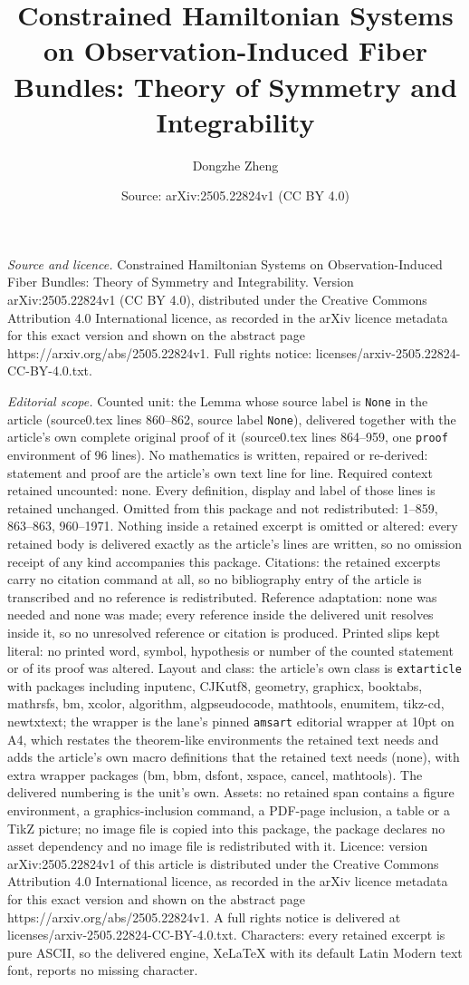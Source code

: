 \documentclass[10pt,a4paper]{amsart}
\title[Constrained Hamiltonian Systems on Observation-Induced Fiber]{Constrained Hamiltonian Systems on Observation-Induced Fiber Bundles: Theory of Symmetry and Integrability}
\author{Dongzhe Zheng}
\date{Source: arXiv:2505.22824v1 (CC BY 4.0)}
\begin{document}
\maketitle

\noindent\emph{Source and licence.} Constrained Hamiltonian Systems on Observation-Induced Fiber Bundles: Theory of Symmetry and Integrability. Version arXiv:2505.22824v1 (CC BY 4.0), distributed under the Creative Commons Attribution 4.0 International licence, as recorded in the arXiv licence metadata for this exact version and shown on the abstract page https://arxiv.org/abs/2505.22824v1. Full rights notice: licenses/arxiv-2505.22824-CC-BY-4.0.txt.\par\smallskip

\noindent\textit{Editorial scope.} Counted unit: the Lemma whose source label is \texttt{None} in the article (source0.tex lines 860--862, source label \texttt{None}), delivered together with the article's own complete original proof of it (source0.tex lines 864--959, one \texttt{proof} environment of 96 lines). No mathematics is written, repaired or re-derived: statement and proof are the article's own text line for line. Required context retained uncounted: none. Every definition, display and label of those lines is retained unchanged. Omitted from this package and not redistributed: 1--859, 863--863, 960--1971. Nothing inside a retained excerpt is omitted or altered: every retained body is delivered exactly as the article's lines are written, so no omission receipt of any kind accompanies this package. Citations: the retained excerpts carry no citation command at all, so no bibliography entry of the article is transcribed and no reference is redistributed. Reference adaptation: none was needed and none was made; every reference inside the delivered unit resolves inside it, so no unresolved reference or citation is produced. Printed slips kept literal: no printed word, symbol, hypothesis or number of the counted statement or of its proof was altered. Layout and class: the article's own class is \texttt{extarticle} with packages including inputenc, CJKutf8, geometry, graphicx, booktabs, mathrsfs, bm, xcolor, algorithm, algpseudocode, mathtools, enumitem, tikz-cd, newtxtext; the wrapper is the lane's pinned \texttt{amsart} editorial wrapper at 10pt on A4, which restates the theorem-like environments the retained text needs and adds the article's own macro definitions that the retained text needs (none), with extra wrapper packages (bm, bbm, dsfont, xspace, cancel, mathtools). The delivered numbering is the unit's own. Assets: no retained span contains a figure environment, a graphics-inclusion command, a PDF-page inclusion, a table or a TikZ picture; no image file is copied into this package, the package declares no asset dependency and no image file is redistributed with it. Licence: version arXiv:2505.22824v1 of this article is distributed under the Creative Commons Attribution 4.0 International licence, as recorded in the arXiv licence metadata for this exact version and shown on the abstract page https://arxiv.org/abs/2505.22824v1. A full rights notice is delivered at licenses/arxiv-2505.22824-CC-BY-4.0.txt. Characters: every retained excerpt is pure ASCII, so the delivered engine, XeLaTeX with its default Latin Modern text font, reports no missing character.
\end{document}
